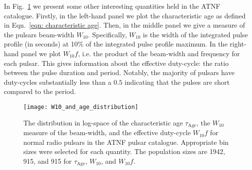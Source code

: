 In Fig.~\ref{fig: pop stats others} we present some other interesting quantities
held in the ATNF catalogue. Firstly, in the left-hand panel we plot the characteristic
age as defined in Eqn.~\eqref{eqn: characteristic age}. Then, in the middle panel
we give a measure of the pulsars beam-width $W_{10}$. Specifically, $W_{10}$ is
the width of the integrated pulse profile (in seconds) at 10\% of the integrated
pulse profile maximum. In the right-hand panel we  plot $W_{10}f$, i.e. the
product of the beam-width and frequency for each pulsar. This gives information
about the effective duty-cycle: the ratio between the pulse duration and period.
Notably, the majority of pulsars have duty-cycles substantially less than a
$0.5$ indicating that the pulses are short compared to the period.
\begin{figure}[htb]
\centering
\texttt{[image: W10\_and\_age\_distribution]}
\caption{The distribution in log-space of the characteristic age
$\tau_{\textrm{Age}}$, the $W_{10}$ measure of the beam-width, and the
effective duty-cycle $W_{10} f$ for normal radio pulsars in the
ATNF pulsar catalogue. Appropriate bin sizes were selected for each quantity.
The population sizes are 1942, 915, and 915 for
$\tau_{\textrm{Age}}$, $W_{10}$, and $W_{10}f$.}
\label{fig: pop stats others}
\end{figure}

